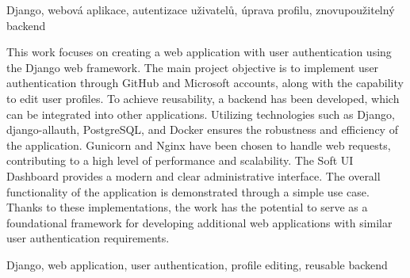\documentclass[12pt, a4paper,
twoside,        %
openright
]{report}
\begin{document}
	\vspace{18pt}
	
	
	\noindent Django, webová aplikace, autentizace uživatelů, úprava profilu, znovupoužitelný backend
	
	\vspace{18pt}

	
	\noindent This work focuses on creating a web application with user authentication using the Django web framework. The main project objective is to implement user authentication through GitHub and Microsoft accounts, along with the capability to edit user profiles. To achieve reusability, a backend has been developed, which can be integrated into other applications. Utilizing technologies such as Django, django-allauth, PostgreSQL, and Docker ensures the robustness and efficiency of the application. Gunicorn and Nginx have been chosen to handle web requests, contributing to a high level of performance and scalability. The Soft UI Dashboard provides a modern and clear administrative interface. The overall functionality of the application is demonstrated through a simple use case. Thanks to these implementations, the work has the potential to serve as a foundational framework for developing additional web applications with similar user authentication requirements.
	
	\vspace{18pt}
	
	
	\noindent Django, web application, user authentication, profile editing, reusable backend
	
	\clearpage %

	
	\tableofcontents %

	\setcounter{page}{1} %

\end{document}
